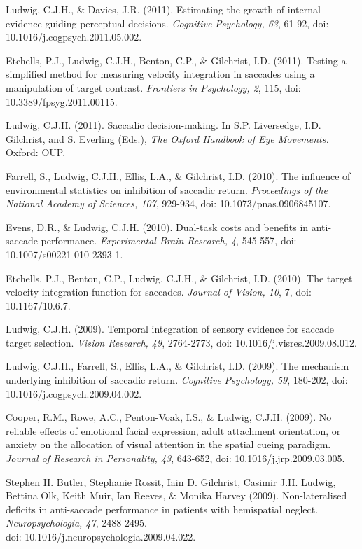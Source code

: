 \documentclass[a4paper, 10pt]{article}
\renewenvironment{itemize}{
  \begin{list}{}{
    \setlength{\leftmargin}{1.5em}
  }
}{
  \end{list}
}
\begin{document}
\begin{itemize}
\item Ludwig, C.J.H., \& Davies, J.R. (2011). Estimating the growth of internal evidence guiding perceptual decisions. {\it Cognitive Psychology, 63}, 61-92, doi: 10.1016/j.cogpsych.2011.05.002.
\item Etchells, P.J., Ludwig, C.J.H., Benton, C.P., \& Gilchrist, I.D. (2011). Testing a simplified method for measuring velocity integration in saccades using a manipulation of target contrast. {\it Frontiers in Psychology, 2}, 115, doi: 10.3389/fpsyg.2011.00115.
\item Ludwig, C.J.H. (2011). Saccadic decision-making. In S.P. Liversedge, I.D. Gilchrist, and S. Everling (Eds.), {\it The Oxford Handbook of Eye Movements.} Oxford: OUP.
\item Farrell, S., Ludwig, C.J.H., Ellis, L.A., \& Gilchrist, I.D. (2010). The influence of environmental statistics on inhibition of saccadic return. {\it Proceedings of the National Academy of Sciences, 107}, 929-934, doi: 10.1073/pnas.0906845107.
\item Evens, D.R., \& Ludwig, C.J.H. (2010). Dual-task costs and benefits in anti-saccade performance. {\it Experimental Brain Research, 4}, 545-557, doi: 10.1007/s00221-010-2393-1.
\item Etchells, P.J., Benton, C.P., Ludwig, C.J.H., \& Gilchrist, I.D. (2010). The target velocity integration function for saccades. {\it Journal of Vision, 10}, 7, doi: 10.1167/10.6.7.
\item Ludwig, C.J.H. (2009). Temporal integration of sensory evidence for saccade target selection. {\it Vision Research, 49}, 2764-2773, doi: 10.1016/j.visres.2009.08.012.
\item Ludwig, C.J.H., Farrell, S., Ellis, L.A., \& Gilchrist, I.D. (2009). The mechanism underlying inhibition of saccadic return. {\it Cognitive Psychology, 59}, 180-202, doi: 10.1016/j.cogpsych.2009.04.002.
\item Cooper, R.M., Rowe, A.C., Penton-Voak, I.S., \& Ludwig, C.J.H. (2009). No reliable effects of emotional facial expression, adult attachment orientation, or anxiety on the allocation of visual attention in the spatial cueing paradigm. {\it Journal of Research in Personality, 43}, 643-652, doi: 10.1016/j.jrp.2009.03.005.
\item Stephen H. Butler, Stephanie Rossit, Iain D. Gilchrist, Casimir J.H. Ludwig, Bettina Olk, Keith Muir, Ian Reeves, \& Monika Harvey (2009). Non-lateralised deficits in anti-saccade performance in patients with hemispatial neglect. {\it Neuropsychologia, 47}, 2488-2495. \\doi: 10.1016/j.neuropsychologia.2009.04.022.

\end{itemize}
\end{document}
